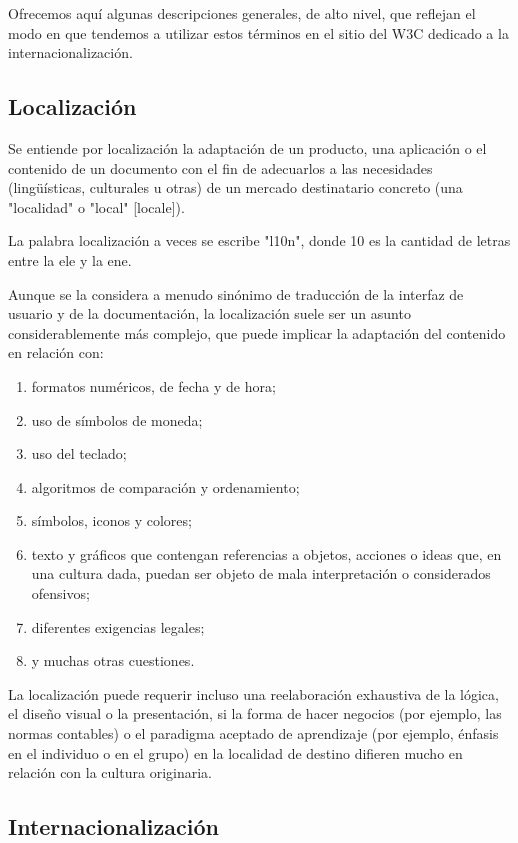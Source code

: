 \begin{enumerate}
Ofrecemos aquí algunas descripciones generales, de alto nivel, que reflejan el modo en que tendemos a utilizar estos términos en el sitio del W3C dedicado a la internacionalización.

\subsection{Localización}

Se entiende por localización la adaptación de un producto, una aplicación o el contenido de un documento con el fin de adecuarlos a las necesidades (lingüísticas, culturales u otras) de un mercado destinatario concreto (una "localidad" o "local" [locale]).

\begin{remark}
	La palabra localización a veces se escribe "l10n", donde 10 es la cantidad de letras entre la ele y la ene.
\end{remark}


Aunque se la considera a menudo sinónimo de traducción de la interfaz de usuario y de la documentación, la localización suele ser un asunto considerablemente más complejo, que puede implicar la adaptación del contenido en relación con:

\begin{enumerate}
	\item formatos numéricos, de fecha y de hora;
	\item uso de símbolos de moneda;
	\item uso del teclado;
	\item algoritmos de comparación y ordenamiento;
	\item símbolos, iconos y colores;
	\item texto y gráficos que contengan referencias a objetos, acciones o ideas que, en una cultura dada, puedan ser objeto de mala interpretación o considerados ofensivos;
	\item diferentes exigencias legales;
	\item y muchas otras cuestiones.
\end{enumerate}

La localización puede requerir incluso una reelaboración exhaustiva de la lógica, el diseño visual o la presentación, si la forma de hacer negocios (por ejemplo, las normas contables) o el paradigma aceptado de aprendizaje (por ejemplo, énfasis en el individuo o en el grupo) en la localidad de destino difieren mucho en relación con la cultura originaria.

\subsection{Internacionalización}


\end{enumerate}
